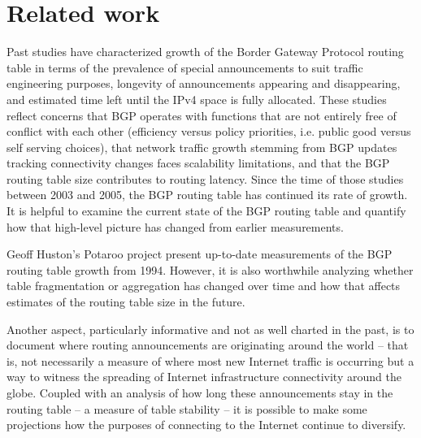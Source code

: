 \section{Related work}
\label{sec:related_work}

Past studies \cite{Meng:2005:IPv4-address} \cite{Xu:2003:IPv4-Address}
\cite{Meng:2003:An-analysis-of-BGP-routing} have characterized growth of the
Border Gateway Protocol routing table in terms of the prevalence of special
announcements to suit traffic engineering purposes, longevity of announcements
appearing and disappearing, and estimated time left until the IPv4 space is
fully allocated. These studies reflect concerns that BGP operates with
functions that are not entirely free of conflict with each other (efficiency
versus policy priorities, i.e. public good versus self serving choices), that
network traffic growth stemming from BGP updates tracking connectivity changes
faces scalability limitations, and that the BGP routing table size contributes
to routing latency. Since the time of those studies between 2003 and 2005, the
BGP routing table has continued its rate of growth. It is helpful to examine
the current state of the BGP routing table and quantify how that high-level
picture has changed from earlier measurements.

Geoff Huston's Potaroo project \cite{::IPv4-Address-Report} present up-to-date
measurements of the BGP routing table growth from 1994. However, it is also
worthwhile analyzing whether table fragmentation or aggregation has changed
over time and how that affects estimates of the routing table size in the
future.

Another aspect, particularly informative and not as well charted in the past,
is to document where routing announcements are originating around the world --
that is, not necessarily a measure of where most new Internet traffic is
occurring but a way to witness the spreading of Internet infrastructure
connectivity around the globe. Coupled with an analysis of how long these
announcements stay in the routing table -- a measure of table stability -- it
is possible to make some projections how the purposes of connecting to the
Internet continue to diversify.

